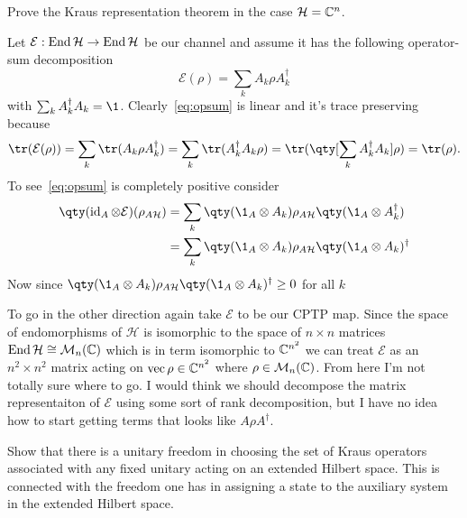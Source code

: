 \documentclass[
	pages,
	boxes,
	color=RoyalPurple
]{homework}
\makeatletter
\numberwithin{tcb@cnt@prob}{section}
\makeatother
\begin{document}
\setcounter{section}{11}

\begin{problem}
Prove the Kraus representation theorem in the case $\mathcal{H} = \mathbb{C}^n$.
\end{problem}

\begin{solution}
    Let $\mathcal{E}: \operatorname{End}{\mathcal{H}}\to\operatorname{End}{\mathcal{H}}$ be our channel and assume it has the following operator-sum decomposition
    \begin{equation}\label{eq:opsum}
        \mathcal{E}(\rho) = \sum_k A_k\rho A_k^\dagger
    \end{equation}
    with $\sum_k A_k^\dagger A_k = \1$. Clearly~\cref{eq:opsum} is linear and it's trace preserving because
    \begin{equation*}
        \tr(\mathcal{E}(\rho)) = \sum_k\tr(A_k\rho A_k^\dagger) = \sum_k \tr(A_k^\dagger A_k\rho) = \tr(\qty[\sum_k A_k^\dagger A_k]\rho) = \tr(\rho).
    \end{equation*}
    To see~\cref{eq:opsum} is completely positive consider
    \begin{align*}
        \qty(\id_A\otimes\mathcal{E})(\rho_{A\mathcal{H}}) & = \sum_k\qty(\1_A\otimes A_k)\rho_{A\mathcal{H}}\qty(\1_A\otimes A_k^\dagger)  \\
                                                           & = \sum_k \qty(\1_A\otimes A_k)\rho_{A\mathcal{H}}\qty(\1_A\otimes A_k)^\dagger
    \end{align*}
    Now since $\qty(\1_A\otimes A_k)\rho_{A\mathcal{H}}\qty(\1_A\otimes A_k)^\dagger \geq 0$ for all $k$ %

    To go in the other direction again take $\mathcal{E}$ to be our CPTP map. Since the space of endomorphisms of $\mathcal{H}$ is isomorphic to the space of $n\times n$ matrices $\operatorname{End}{\mathcal{H}}\cong\mathcal{M}_{n}(\mathbb{C})$ which is in term isomorphic to $\mathbb{C}^{n^2}$ we can treat $\mathcal{E}$ as an $n^2\times n^2$ matrix acting on $\operatorname{vec}{\rho}\in\mathbb{C}^{n^2}$ where $\rho\in\mathcal{M}_{n}(\mathbb{C})$. From here I'm not totally sure where to go. I would think we should decompose the matrix representaiton of $\mathcal{E}$ using some sort of rank decomposition, but I have no idea how to start getting terms that looks like $A\rho A^\dagger$.
\end{solution}

\begin{problem}
Show that there is a unitary freedom in choosing the set of Kraus operators associated with any fixed unitary acting on an extended Hilbert space. This is connected with the freedom one has in assigning a state to the auxiliary system in the extended Hilbert space.
\end{problem}
\end{document}
